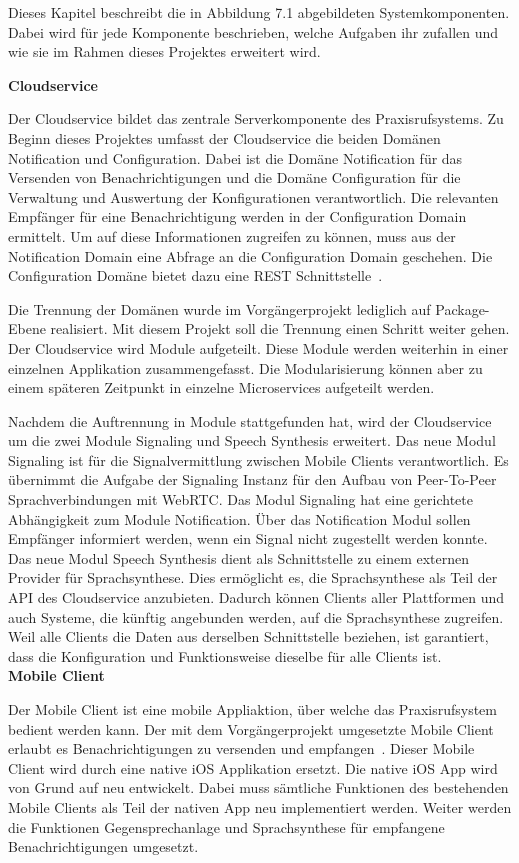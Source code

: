 Dieses Kapitel beschreibt die in Abbildung 7.1 abgebildeten Systemkomponenten.
Dabei wird für jede Komponente beschrieben, welche Aufgaben ihr zufallen und wie sie im Rahmen dieses Projektes erweitert wird.

\textbf{Cloudservice}

Der Cloudservice bildet das zentrale Serverkomponente des Praxisrufsystems.
Zu Beginn dieses Projektes umfasst der Cloudservice die beiden Domänen Notification und Configuration.
Dabei ist die Domäne Notification für das Versenden von Benachrichtigungen und die Domäne Configuration für die Verwaltung und Auswertung der Konfigurationen verantwortlich.
Die relevanten Empfänger für eine Benachrichtigung werden in der Configuration Domain ermittelt.
Um auf diese Informationen zugreifen zu können, muss aus der Notification Domain eine Abfrage an die Configuration Domain geschehen.
Die Configuration Domäne bietet dazu eine REST Schnittstelle~\cite{ip5}.

Die Trennung der Domänen wurde im Vorgängerprojekt lediglich auf Package-Ebene realisiert.
Mit diesem Projekt soll die Trennung einen Schritt weiter gehen.
Der Cloudservice wird Module aufgeteilt.
Diese Module werden weiterhin in einer einzelnen Applikation zusammengefasst.
Die Modularisierung können aber zu einem späteren Zeitpunkt in einzelne Microservices aufgeteilt werden.

Nachdem die Auftrennung in Module stattgefunden hat, wird der Cloudservice um die zwei Module Signaling und Speech Synthesis erweitert.
Das neue Modul Signaling ist für die Signalvermittlung zwischen Mobile Clients verantwortlich.
Es übernimmt die Aufgabe der Signaling Instanz für den Aufbau von Peer-To-Peer Sprachverbindungen mit WebRTC.
Das Modul Signaling hat eine gerichtete Abhängigkeit zum Module Notification.
Über das Notification Modul sollen Empfänger informiert werden, wenn ein Signal nicht zugestellt werden konnte.
Das neue Modul Speech Synthesis dient als Schnittstelle zu einem externen Provider für Sprachsynthese.
Dies ermöglicht es, die Sprachsynthese als Teil der API des Cloudservice anzubieten.
Dadurch können Clients aller Plattformen und auch Systeme, die künftig angebunden werden, auf die Sprachsynthese zugreifen.
Weil alle Clients die Daten aus derselben Schnittstelle beziehen, ist garantiert, dass die Konfiguration und Funktionsweise dieselbe für alle Clients ist. \\

\textbf{Mobile Client}

Der Mobile Client ist eine mobile Appliaktion, über welche das Praxisrufsystem bedient werden kann.
Der mit dem Vorgängerprojekt umgesetzte Mobile Client erlaubt es Benachrichtigungen zu versenden und empfangen~\cite{ip5}.
Dieser Mobile Client wird durch eine native iOS Applikation ersetzt.
Die native iOS App wird von Grund auf neu entwickelt.
Dabei muss sämtliche Funktionen des bestehenden Mobile Clients als Teil der nativen App neu implementiert werden.
Weiter werden die Funktionen Gegensprechanlage und Sprachsynthese für empfangene Benachrichtigungen umgesetzt.

